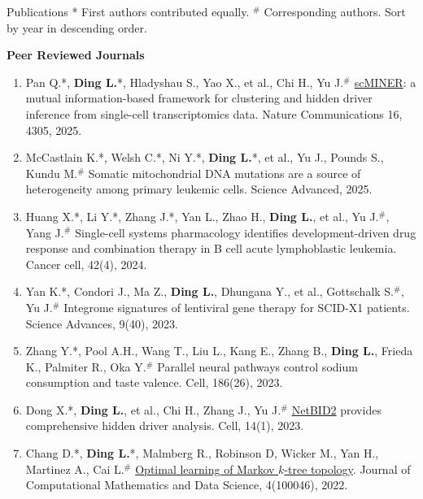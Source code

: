 \documentclass{resume} %
\begin{document}
\begin{rSection}{Publications}
* First authors contributed equally.  $^{\#}$ Corresponding authors. Sort by year in descending order.

\textbf{Peer Reviewed Journals}
\begin{enumerate}
\item Pan Q.*, \textbf{Ding L.}*, Hladyshau S., Yao X., et al., Chi H., Yu J.$^{\#}$ \href{https://www.nature.com/articles/s41467-025-59620-6}{scMINER}: a mutual information-based framework for clustering and hidden driver inference from single-cell transcriptomics data. Nature Communications 16, 4305, 2025.

\item McCastlain K.*, Welsh C.*, Ni Y.*, \textbf{Ding L.}*, et al., Yu J., Pounds S., Kundu M.$^{\#}$ Somatic mitochondrial DNA mutations are a source of heterogeneity among primary leukemic cells. Science Advanced, 2025.

\item Huang X.*, Li Y.*, Zhang J.*, Yan L., Zhao H., \textbf{Ding L.}, et al., Yu J.$^{\#}$, Yang J.$^{\#}$ Single-cell systems pharmacology identifies development-driven drug response and combination therapy in B cell acute lymphoblastic leukemia. Cancer cell, 42(4), 2024.

\item Yan K.*, Condori J., Ma Z., \textbf{Ding L.}, Dhungana Y., et al., Gottschalk S.$^{\#}$, Yu J.$^{\#}$ Integrome signatures of lentiviral gene therapy for SCID-X1 patients. Science Advances, 9(40), 2023.

\item Zhang Y.*, Pool A.H., Wang T., Liu L., Kang E., Zhang B., \textbf{Ding L.}, Frieda K., Palmiter R., Oka Y.$^{\#}$ Parallel neural pathways control sodium consumption and taste valence. Cell, 186(26), 2023.

\item Dong X.*, \textbf{Ding L.}, et al., Chi H., Zhang J., Yu J.$^{\#}$ \href{https://www.nature.com/articles/s41467-023-38335-6}{NetBID2} provides comprehensive hidden driver analysis. Cell, 14(1), 2023.

\item Chang D.*, \textbf{Ding L.}*, Malmberg R., Robinson D, Wicker M., Yan H., Martinez A., Cai L.$^{\#}$ \href{https://www.sciencedirect.com/science/article/pii/S277241582200013X}{Optimal learning of Markov $k$-tree topology}. Journal of Computational Mathematics and Data Science, 4(100046), 2022.


\end{enumerate}
\end{rSection}
\end{document}
